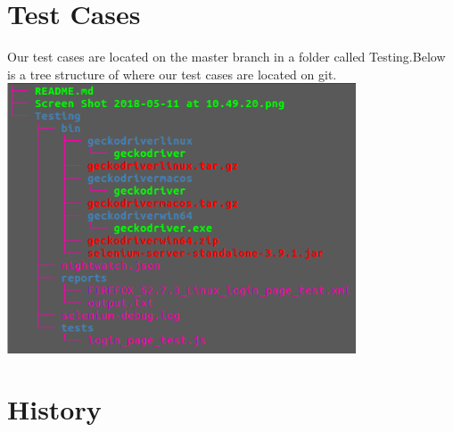 \documentclass[12pt]{article}
\begin{document}
	
	\section{Test Cases}
	Our test cases are located on the master branch in a folder called Testing.Below is a tree structure of where our test cases are located on git.
	\includegraphics[width=0.8\linewidth, height=8cm]{tree.png}
	
	\section{History}
	
	
	
	
	
	
	
	
	
	
\end{document}
